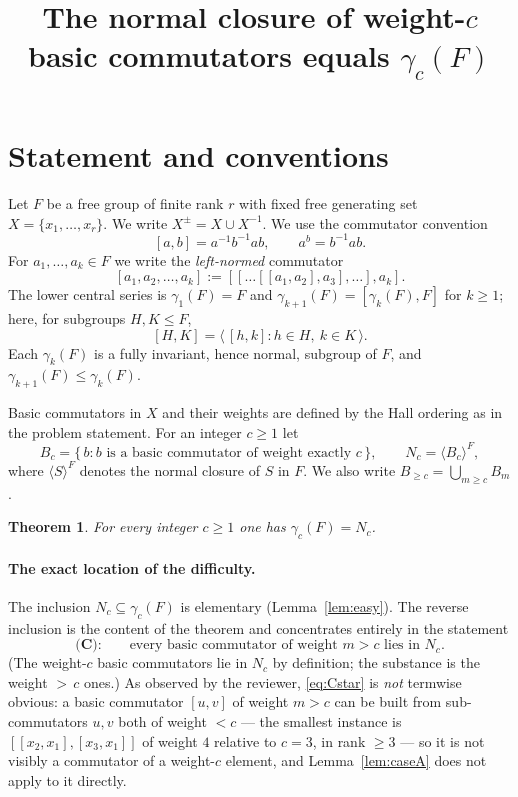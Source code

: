 \documentclass{amsart}
\newtheorem{theorem}{Theorem}
\theoremstyle{definition}
\theoremstyle{remark}
\begin{document}
\title{The normal closure of weight-$c$ basic commutators equals $\gamma_c(F)$}
\maketitle

\section{Statement and conventions}

Let $F$ be a free group of finite rank $r$ with fixed free generating set
$X=\{x_1,\dots,x_r\}$. We write $X^{\pm}=X\cup X^{-1}$. We use the commutator
convention
\[
[a,b]=a^{-1}b^{-1}ab ,\qquad a^{b}=b^{-1}ab .
\]
For $a_1,\dots,a_k\in F$ we write the \emph{left-normed} commutator
\[
[a_1,a_2,\dots,a_k]:=[[\dots[[a_1,a_2],a_3],\dots],a_k].
\]
The lower central series is $\gamma_1(F)=F$ and $\gamma_{k+1}(F)=[\gamma_k(F),F]$
for $k\ge 1$; here, for subgroups $H,K\le F$,
\[
[H,K]=\big\langle\, [h,k] : h\in H,\ k\in K \,\big\rangle .
\]
Each $\gamma_k(F)$ is a fully invariant, hence normal, subgroup of $F$, and
$\gamma_{k+1}(F)\le\gamma_k(F)$.

Basic commutators in $X$ and their weights are defined by the Hall ordering as in
the problem statement. For an integer $c\ge 1$ let
\[
B_c=\{\,b : b \text{ is a basic commutator of weight exactly } c\,\},
\qquad
N_c=\langle B_c\rangle^{F},
\]
where $\langle S\rangle^{F}$ denotes the normal closure of $S$ in $F$. We also
write $B_{\ge c}=\bigcup_{m\ge c}B_m$.

\begin{theorem}\label{thm:main}
For every integer $c\ge 1$ one has $\gamma_c(F)=N_c$.
\end{theorem}

\paragraph{The exact location of the difficulty.}
The inclusion $N_c\subseteq\gamma_c(F)$ is elementary (Lemma~\ref{lem:easy}). The
reverse inclusion is the content of the theorem and concentrates entirely in the
statement
\begin{equation}\label{eq:Cstar}
\textbf{(C):}\qquad
\text{every basic commutator of weight }m> c\text{ lies in }N_c .
\end{equation}
(The weight-$c$ basic commutators lie in $N_c$ by definition; the substance is the
weight ${>}\,c$ ones.) As observed by the reviewer, \eqref{eq:Cstar} is \emph{not}
termwise obvious: a basic commutator $[u,v]$ of weight $m>c$ can be built from
sub-commutators $u,v$ both of weight $<c$ --- the smallest instance is
$[[x_2,x_1],[x_3,x_1]]$ of weight $4$ relative to $c=3$, in rank $\ge 3$ --- so it
is not visibly a commutator of a weight-$c$ element, and Lemma~\ref{lem:caseA}
does not apply to it directly.
\end{document}
